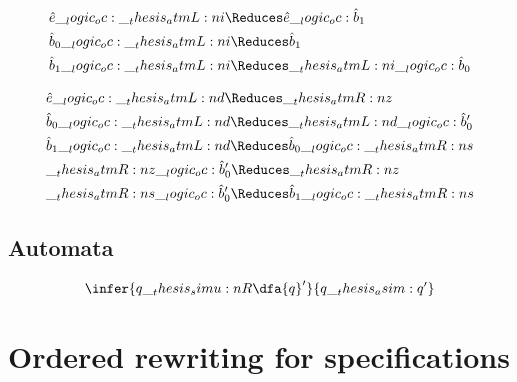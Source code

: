 \begin{equation*}
  \begin{lgathered}
    \bin{e} \oc \atmL{i} \Reduces \bin{e} \oc \bin{b}_1 \\
    \bin{b}_0 \oc \atmL{i} \Reduces \bin{b}_1 \\
    \bin{b}_1 \oc \atmL{i} \Reduces \atmL{i} \oc \bin{b}_0
  \end{lgathered}
\end{equation*}

\begin{equation*}
  \begin{lgathered}
    \bin{e} \oc \atmL{d} \Reduces \atmR{z} \\
    \bin{b}_0 \oc \atmL{d} \Reduces \atmL{d} \oc \bin{b}'_0 \\
    \bin{b}_1 \oc \atmL{d} \Reduces \bin{b}_0 \oc \atmR{s} \\
    \atmR{z} \oc \bin{b}'_0 \Reduces \atmR{z} \\
    \atmR{s} \oc \bin{b}'_0 \Reduces \bin{b}_1 \oc \atmR{s}
  \end{lgathered}
\end{equation*}


\subsection{Automata}


\begin{equation*}
  \infer{q \simu{R} \dfa{q}'}{
    q \asim q'}
\end{equation*}


\section{Ordered rewriting for specifications}

